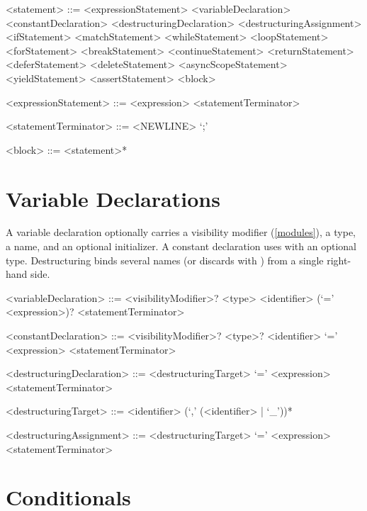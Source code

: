 \documentclass[makeidx]{article}
\begin{document}
\begin{grammar}
<statement> ::= <expressionStatement>
  \alt <variableDeclaration>
  \alt <constantDeclaration>
  \alt <destructuringDeclaration>
  \alt <destructuringAssignment>
  \alt <ifStatement>
  \alt <matchStatement>
  \alt <whileStatement>
  \alt <loopStatement>
  \alt <forStatement>
  \alt <breakStatement>
  \alt <continueStatement>
  \alt <returnStatement>
  \alt <deferStatement>
  \alt <deleteStatement>
  \alt <asyncScopeStatement>
  \alt <yieldStatement>
  \alt <assertStatement>
  \alt <block>

<expressionStatement> ::= <expression> <statementTerminator>

<statementTerminator> ::= <NEWLINE>
  \alt `;'

<block> ::= \DO{} <statement>* \END{}
\end{grammar}

\section{Variable Declarations}

\LMHash{}%
A variable declaration optionally carries a visibility modifier
(\ref{modules}), a type, a name, and an optional initializer.
A constant declaration uses  with an optional type.
Destructuring binds several names (or discards with \code{\_})
from a single right-hand side.

\begin{grammar}
<variableDeclaration> ::= <visibilityModifier>? <type> <identifier>
  \gnewline{} (`=' <expression>)? <statementTerminator>

<constantDeclaration> ::= <visibilityModifier>? \CONST{} <type>? <identifier>
  \gnewline{} `=' <expression> <statementTerminator>

<destructuringDeclaration> ::= <destructuringTarget>
  \gnewline{} `=' <expression> <statementTerminator>

<destructuringTarget> ::= <identifier> (`,' (<identifier> | `_'))*

<destructuringAssignment> ::= <destructuringTarget>
  \gnewline{} `=' <expression> <statementTerminator>
\end{grammar}

\section{Conditionals}
\end{document}

